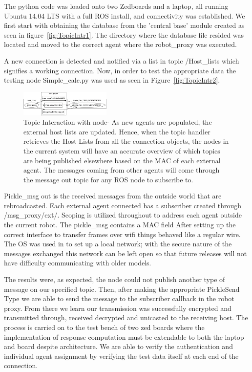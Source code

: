 \documentclass[conference]{IEEEtran}
\begin{document}
The python code was loaded onto two Zedboards and a laptop, all running Ubuntu 14.04 LTS with a full ROS install, and connectivity was established. We first start with obtaining the database from the 'central base' module created as seen in figure~\autoref{fig:TopicIntr1}. The directory where the database file resided was located and moved to the correct agent where the robot\_proxy was executed.

A new connection is detected and notified via a list in topic /Host\_lists which signifies a working connection. Now, in order to test the appropriate data the testing node Simple\_calc.py was used as seen in Figure~\autoref{fig:TopicIntr2}.

\begin{figure}[h]
\centering
\includegraphics[width=0.4\textwidth]{TopicIntr2}
\caption{Topic Interaction with node- As new agents are populated, the external host lists are updated. Hence, when the topic handler retrieves the Host Lists from all the connection objects, the nodes in the current system will have an accurate overview of which topics are being published elsewhere based on the MAC of each external agent. The messages coming from other agents will come through the message out topic for any ROS node to subscribe to.}
\label{fig:TopicIntr2}
\end{figure}

Pickle\_msg out is the received messages from the outside world that are rebroadcasted. Each external agent connected has a subscriber created through /msg\_proxy/ext/. Scoping is utilized throughout to address each agent outside the current robot. The pickle\_msg contains a MAC field After setting up the correct interface to transfer frames over wifi things behaved like a regular wire. The OS was used in to set up a local network; with the secure nature of the messages exchanged this network can be left open so that future releases will not have difficulty communicating with older models. 

The results were, as expected, the node could not publish another type of message on our specified topic. Then, after making the appropriate PickleSend Type we are able to send the message to the subscriber callback in the robot proxy. From there we learn our transmission was successfully encrypted and transmitted through, received decrypted and unicasted to the receiving host. The process is carried on to the test bench of two zed boards where the implementation of response computation must be extendable to both the laptop and board despite architecture. We are able to verify the authentication and individual agent assignment by verifying the test data itself at each end of the connection.
\end{document}

